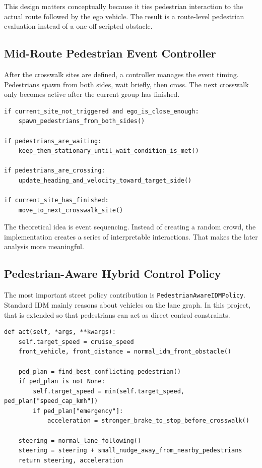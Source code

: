 \documentclass[12pt,a4paper]{report}
\begin{document}
This design matters conceptually because it ties pedestrian interaction to the actual route followed by the ego vehicle. The result is a route-level pedestrian evaluation instead of a one-off scripted obstacle.

\subsection{Mid-Route Pedestrian Event Controller}
After the crosswalk sites are defined, a controller manages the event timing. Pedestrians spawn from both sides, wait briefly, then cross. The next crosswalk only becomes active after the current group has finished.

\begin{lstlisting}[caption={Simplified logic of the mid-route pedestrian event controller.},label={lst:ped_controller},float=H]
if current_site_not_triggered and ego_is_close_enough:
    spawn_pedestrians_from_both_sides()

if pedestrians_are_waiting:
    keep_them_stationary_until_wait_condition_is_met()

if pedestrians_are_crossing:
    update_heading_and_velocity_toward_target_side()

if current_site_has_finished:
    move_to_next_crosswalk_site()
\end{lstlisting}

The theoretical idea is event sequencing. Instead of creating a random crowd, the implementation creates a series of interpretable interactions. That makes the later analysis more meaningful.

\subsection{Pedestrian-Aware Hybrid Control Policy}
The most important street policy contribution is \texttt{PedestrianAwareIDMPolicy}. Standard IDM mainly reasons about vehicles on the lane graph. In this project, that is extended so that pedestrians can act as direct control constraints.

\begin{lstlisting}[caption={Simplified decision logic of the pedestrian-aware IDM policy.},label={lst:ped_idm_logic},float=H]
def act(self, *args, **kwargs):
    self.target_speed = cruise_speed
    front_vehicle, front_distance = normal_idm_front_obstacle()

    ped_plan = find_best_conflicting_pedestrian()
    if ped_plan is not None:
        self.target_speed = min(self.target_speed, ped_plan["speed_cap_kmh"])
        if ped_plan["emergency"]:
            acceleration = stronger_brake_to_stop_before_crosswalk()

    steering = normal_lane_following()
    steering = steering + small_nudge_away_from_nearby_pedestrians
    return steering, acceleration
\end{lstlisting}
\end{document}
